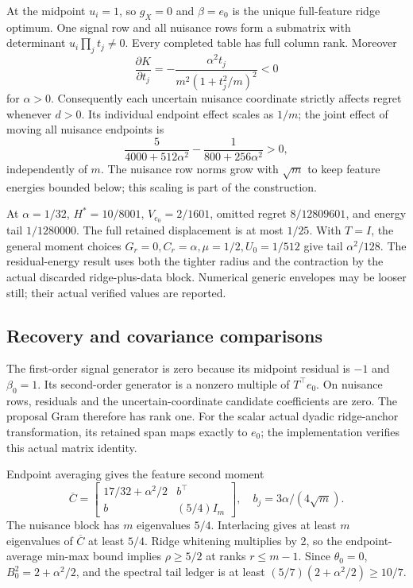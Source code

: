 At the midpoint $u_i=1$, so $g_X=0$ and $\beta=e_0$ is the unique full-feature ridge optimum. One signal row and all nuisance rows form a submatrix with determinant $u_i\prod_jt_j\ne0$. Every completed table has full column rank. Moreover
\[
 \frac{\partial K}{\partial t_j}
 =-\frac{\alpha^2t_j}{m^2(1+t_j^2/m)^2}<0
\]
for $\alpha>0$. Consequently each uncertain nuisance coordinate strictly affects regret whenever $d>0$. Its individual endpoint effect scales as $1/m$; the joint effect of moving all nuisance endpoints is
\[
 \frac5{4000+512\alpha^2}-\frac1{800+256\alpha^2}>0,
\]
independently of $m$. The nuisance row norms grow with $\sqrt m$ to keep feature energies bounded below; this scaling is part of the construction.

At $\alpha=1/32$, $H^*=10/8001$, $V_{e_0}=2/1601$, omitted regret $8/12809601$, and energy tail $1/1280000$. The full retained displacement is at most $1/25$. With $T=I$, the general moment choices $G_r=0,C_r=\alpha,\mu=1/2,U_0=1/512$ give tail $\alpha^2/128$. The residual-energy result uses both the tighter radius and the contraction by the actual discarded ridge-plus-data block. Numerical generic envelopes may be looser still; their actual verified values are reported.

\subsection{Recovery and covariance comparisons}
The first-order signal generator is zero because its midpoint residual is $-1$ and $\beta_0=1$. Its second-order generator is a nonzero multiple of $T^\top e_0$. On nuisance rows, residuals and the uncertain-coordinate candidate coefficients are zero. The proposal Gram therefore has rank one. For the scalar actual dyadic ridge-anchor transformation, its retained span maps exactly to $e_0$; the implementation verifies this actual matrix identity.

Endpoint averaging gives the feature second moment
\[
 \overline C=\begin{bmatrix}
 17/32+\alpha^2/2&b^\top\\ b&(5/4)I_m
 \end{bmatrix},\quad b_j=3\alpha/(4\sqrt m).
\]
The nuisance block has $m$ eigenvalues $5/4$. Interlacing gives at least $m$ eigenvalues of $\overline C$ at least $5/4$. Ridge whitening multiplies by 2, so the endpoint-average min-max bound implies $\rho\geq5/2$ at ranks $r\leq m-1$. Since $\theta_0=0$, $B_0^2=2+\alpha^2/2$, and the spectral tail ledger is at least $(5/7)(2+\alpha^2/2)\geq10/7$.

